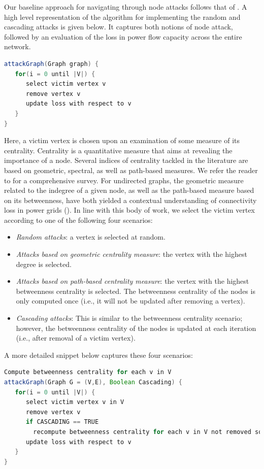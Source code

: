 Our baseline approach for navigating through node attacks follows that of \cite{2000Natur.406..378A}. A high level representation of the algorithm for implementing the random and cascading attacks is given below. It captures both notions of node attack, followed by an evaluation of the loss in power flow capacity across the entire network.
\begin{lstlisting}[language=java]
attackGraph(Graph graph) {
   for(i = 0 until |V|) {
      select victim vertex v
      remove vertex v
      update loss with respect to v
   }
}
\end{lstlisting}
Here, a victim vertex is chosen upon an examination of some measure of its centrality. Centrality is a quantitative measure that aims at revealing the importance of a node. Several indices of centrality tackled in the literature are based on geometric, spectral, as well as path-based measures. We refer the reader to \cite{BoldiVigna14} for a comprehensive survey. For undirected graphs, the geometric measure related to the indegree of a given node, as well as the path-based measure based on its betweenness, have both yielded a contextual understanding of connectivity loss in power grids (\cite{2000Natur.406..378A, JinAl10}). In line with this body of work, we select the victim vertex according to one of the following four scenarios:
\begin{itemize}
\item \emph{Random attacks}: a vertex is selected at random.
\item \emph{Attacks based on geometric centrality measure}: the vertex with the highest degree is selected. 
\item \emph{Attacks based on path-based centrality measure}: the vertex with the highest betweenness centrality is selected. The betweenness centrality of the nodes is only computed once (i.e., it will not be updated after removing a vertex). 
\item \emph{Cascading attacks}: This is similar to the betweenness centrality scenario; however, the betweenness centrality of the nodes is updated at each iteration (i.e., after removal of a victim vertex).
\end{itemize}
A more detailed snippet below captures these four scenarios:
\begin{lstlisting}[language=java]
Compute betweenness centrality for each v in V
attackGraph(Graph G = (V,E), Boolean Cascading) {
   for(i = 0 until |V|) {
      select victim vertex v in V
      remove vertex v
      if CASCADING == TRUE
        recompute betweenness centrality for each v in V not removed so far
      update loss with respect to v
   }
}
\end{lstlisting}
